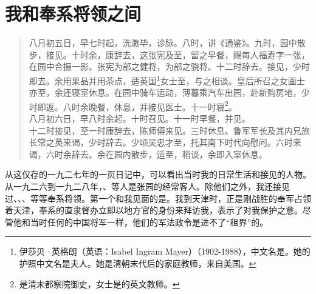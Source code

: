\fancyhead[RO]{\thepage} %
\fancyhead[LE]{\thepage} %
\chapter*{我和奉系将领之间}
\begin{quote}
	八月初五日，早七时起，洗漱毕，诊脉。八时，讲《通鉴》。九时，园中散步，接见。十时余，康辞去，这张宪及至，留之早餐，赐每人福寿字一张，在园中合摄一影。张宪为部之健将，为部之骁将。十二时辞去。接见，少时即去。余用果品并用茶点，适英国\footnote{伊莎贝·英格朗（英语：Isabel Ingram Mayer）（1902-1988），中文名是。她的护照中文名是夫人。她是清朝末代后的家庭教师，来自美国。}女士至，与之相谈。皇后所召之女画士亦至，余还寝室休息。在园中骑车运动，薄暮乘汽车出园，赴新购房地，少时即返。八时余晚餐，休息，并接见医士。十一时寝\footnote{是清末都察院御史，女士是的英文教师。}。\\

八月初六日，早八时余起。十时召见。十一时早餐，并见。\\

十二时接见，至一时康辞去，陈师傅来见。三时休息。鲁军军长及其内兄旅长常之英来谒，少时辞去。少顷吴忠才至，托其南下时代向慰问。六时来谒，六时余辞去。余在园内散步，适至，稍谈，余即入室休息。\\
\end{quote}

从这仅存的一九二七年的一页日记中，可以看出当时我的日常生活和接见的人物。从一九二六到一九二八年，、等人是张园的经常客人。除他们之外，我还接见过、、、等等奉系将领。第一个和我见面的是。我到天津时，正是刚战胜的奉军占领着天津，奉系的直隶督办立即以地方官的身份来拜访我，表示了对我保护之意。尽管他和当时任何的中国将军一样，他们的军法政令是进不了“租界”的。\\

